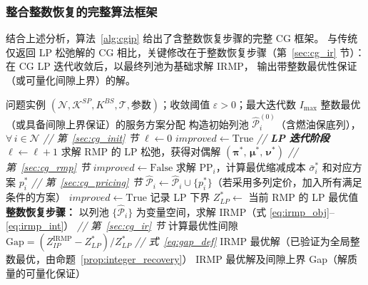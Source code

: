 \documentclass[UTF8, a4paper, 12pt]{ctexart}
\begin{document}
\subsubsection{整合整数恢复的完整算法框架}
\label{sec:cg_algorithm_full}

结合上述分析，算法~\ref{alg:cgip} 给出了含整数恢复步骤的完整 CG 框架。
与传统仅返回 LP 松弛解的 CG 相比，关键修改在于整数恢复步骤（第~\ref{sec:cg_ir} 节）：
在 CG LP 迭代收敛后，以最终列池为基础求解 IRMP，
输出带整数最优性保证（或可量化间隙上界）的解。

\begin{algorithm}[htbp]
\caption{含整数恢复的列生成求解框架（CG+IR）}
\label{alg:cgip}
\begin{algorithmic}[1]
\REQUIRE 问题实例 $(\mathcal{N}, \mathcal{K}^{SP}, K^{BS}, \mathcal{T},
  \text{参数})$；收敛阈值 $\varepsilon > 0$；最大迭代数 $I_{\max}$
\ENSURE 整数最优（或具备间隙上界保证）的服务方案分配
\STATE 构造初始列池 $\hat{\mathcal{P}}_i^{(0)}$（含燃油保底列），$\forall\, i \in \mathcal{N}$
  \hfill \textit{// 第~\ref{sec:cg_init} 节}
\STATE $\ell \leftarrow 0$
\STATE $\textit{improved} \leftarrow \mathrm{True}$
  \STATE \textit{// \textbf{LP 迭代阶段}}
  \STATE $\ell \leftarrow \ell + 1$
  \STATE 求解 RMP 的 LP 松弛，获得对偶解
    $(\boldsymbol{\pi}^*,\, \boldsymbol{\mu}^*,\, \boldsymbol{\nu}^*)$
    \hfill \textit{// 第~\ref{sec:cg_rmp} 节}
  \STATE $\textit{improved} \leftarrow \mathrm{False}$
    \STATE 求解 $\text{PP}_i$，计算最优缩减成本 $\bar{\sigma}_i^*$ 和对应方案 $p_i^*$
      \hfill \textit{// 第~\ref{sec:cg_pricing} 节}
      \STATE $\hat{\mathcal{P}}_i \leftarrow \hat{\mathcal{P}}_i \cup \{p_i^*\}$（若采用多列定价，加入所有满足条件的方案）
      \STATE $\textit{improved} \leftarrow \mathrm{True}$
    \ENDIF
  \ENDFOR
\ENDWHILE
\STATE 记录 LP 下界 $Z_{LP}^* \leftarrow$ 当前 RMP 的 LP 最优值
\STATE \textbf{整数恢复步骤：} 以列池 $\{\hat{\mathcal{P}}_i\}$ 为变量空间，求解 IRMP（式
  \eqref{eq:irmp_obj}--\eqref{eq:irmp_int}）
  \hfill \textit{// 第~\ref{sec:cg_ir} 节}
\STATE 计算最优性间隙 $\text{Gap} = (Z_{IP}^{\text{IRMP}} - Z_{LP}^*) / Z_{LP}^*$
  \hfill \textit{// 式~\eqref{eq:gap_def}}
  \RETURN IRMP 最优解（已验证为全局整数最优，由命题~\ref{prop:integer_recovery}）
\ELSE
  \RETURN IRMP 最优解及间隙上界 Gap（解质量的可量化保证）
\ENDIF
\end{algorithmic}
\end{algorithm}
\end{document}

